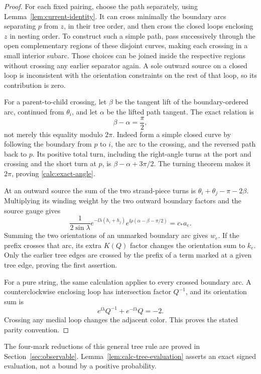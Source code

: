 \begin{proof}
For each fixed pairing, choose the path separately, using
Lemma~\ref{lem:current-identity}.  It can cross minimally the
boundary arcs separating $p$ from $z$, in their tree order, and then
cross the closed loops enclosing $z$ in nesting order.  To construct
such a simple path, pass successively through the open complementary
regions of these disjoint curves, making each crossing in a small
interior subarc.  Those choices can be joined inside the respective
regions without crossing any earlier separator again.  A sole outward
source on a closed loop is inconsistent with the orientation
constraints on the rest of that loop, so its contribution is zero.

For a parent-to-child crossing, let $\beta$ be the tangent lift of the
boundary-ordered arc, continued from $\theta_i$, and let $\alpha$ be
the lifted path tangent.  The exact relation is
\begin{equation}
 \beta-\alpha=\frac{\pi}{2},
 \label{calc:exact-angle}
\end{equation}
not merely this equality modulo $2\pi$.  Indeed form a simple closed
curve by following the boundary from $p$ to $i$, the arc to the
crossing, and the reversed path back to $p$.  Its positive total turn,
including the right-angle turns at the port and crossing and the
short turn at $p$, is $\beta-\alpha+3\pi/2$.  The turning theorem
makes it $2\pi$, proving \eqref{calc:exact-angle}.

At an outward source the sum of the two strand-piece turns is
$\theta_i+\theta_j-\pi-2\beta$.  Multiplying its winding weight by
the two outward boundary factors and the source gauge gives
\[
 \frac{1}{2\sin\lambda}
 e^{-\ii\lambda(h_i+h_j)}
 e^{\ii\rho(\alpha-\beta-\pi/2)}
 = c_*a_e .
\]
Summing the two orientations of an unmarked boundary arc gives $w_e$.
If the prefix crosses that arc, its extra $K(Q)$ factor changes the
orientation sum to $k_e$.  Only the earlier tree edges are crossed by
the prefix of a term marked at a given tree edge, proving the first
assertion.

For a pure string, the same calculation applies to every crossed
boundary arc.  A counterclockwise enclosing loop has intersection
factor $Q^{-1}$, and its orientation sum is
\[
 e^{\ii\lambda}Q^{-1}+e^{-\ii\lambda}Q=-2.
\]
Crossing any medial loop changes the adjacent color.  This proves
the stated parity convention.
\end{proof}

The four-mark reductions of this general tree rule are proved in
Section~\ref{sec:observable}.  Lemma~\ref{lem:calc-tree-evaluation}
asserts an exact signed evaluation, not a bound by a positive
probability.

